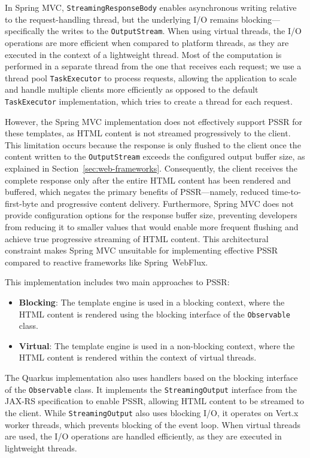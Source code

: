 \documentclass[software,article,accept,pdftex,moreauthors]{Definitions/mdpi}
\begin{document}
In Spring MVC, \texttt{StreamingResponseBody} enables asynchronous writing
relative to the request-handling thread, but the underlying I/O remains
blocking---specifically the writes to the \texttt{OutputStream}. When using
virtual threads, the I/O operations are more efficient when compared to
platform threads, as they are executed in the context of a lightweight thread.
Most of the computation is performed in a separate thread from the one that receives
each request; we use a thread pool \texttt{TaskExecutor} to process requests,
allowing the application to scale and handle multiple clients more efficiently
as opposed to the default \texttt{TaskExecutor} implementation, which tries to
create a thread for each request.

However, the Spring MVC implementation does not effectively support PSSR for
these templates, as HTML content is not streamed progressively to the client.
This limitation occurs because the response is only flushed to the client once
the content written to the \texttt{OutputStream} exceeds the configured output
buffer size, as explained in Section~\ref{sec:web-frameworks}. Consequently,
the client receives the complete response only after the entire HTML content
has been rendered and buffered, which negates the primary benefits of
PSSR---namely, reduced time-to-first-byte and progressive content delivery.
Furthermore, Spring MVC does not provide configuration options for the response
buffer size, preventing developers from reducing it to smaller values that
would enable more frequent flushing and achieve true progressive streaming of
HTML content. This architectural constraint makes Spring MVC unsuitable for
implementing effective PSSR compared to reactive frameworks like Spring~WebFlux.

This implementation includes two main approaches to PSSR\@:
\begin{itemize}
      \item \textbf{Blocking}: The template engine is used in a blocking context,
            where the HTML content is rendered using the blocking interface of the
            \texttt{Observable} class.
      \item \textbf{Virtual}: The template engine is used in a non-blocking context,
            where the HTML content is rendered within the context of virtual threads.
\end{itemize}

The Quarkus implementation also uses handlers based on the blocking interface
of the \texttt{Observable} class. It implements the \texttt{StreamingOutput}
interface from the JAX-RS specification to enable PSSR, allowing HTML content
to be streamed to the client. While \texttt{StreamingOutput} also uses blocking
I/O, it operates on Vert.x worker threads, which prevents blocking of the event
loop. When virtual threads are used, the I/O operations are handled
efficiently, as they are executed in lightweight threads.
\end{document}
